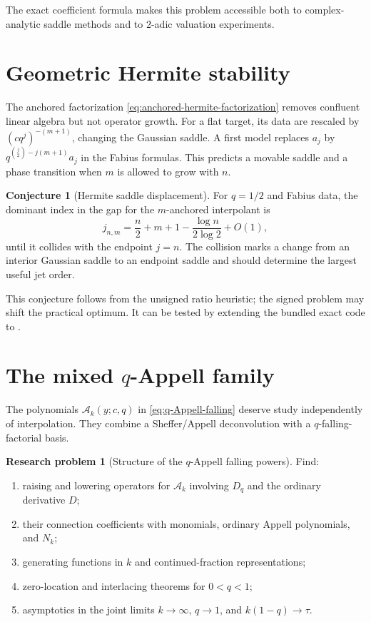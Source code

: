 \documentclass[11pt,oneside]{book}
\numberwithin{equation}{chapter}
\theoremstyle{definition}
\newtheorem{conjecture}[theorem]{Conjecture}
\newtheorem{problem}[theorem]{Research problem}
\theoremstyle{remark}
\begin{document}
The exact coefficient formula makes this problem accessible both to
complex-analytic saddle methods and to $2$-adic valuation experiments.

\section{Geometric Hermite stability}

The anchored factorization \eqref{eq:anchored-hermite-factorization} removes
confluent linear algebra but not operator growth.  For a flat target, its
data are rescaled by $(cq^j)^{-(m+1)}$, changing the Gaussian saddle.
A first model replaces $a_j$ by
$q^{\binom j2-j(m+1)}a_j$ in the Fabius formulas.  This predicts a movable
saddle and a phase transition when $m$ is allowed to grow with $n$.

\begin{conjecture}[Hermite saddle displacement]
\label{conj:hermite-saddle}
For $q=1/2$ and Fabius data, the dominant index in the gap for the
$m$-anchored interpolant is
\begin{equation}
 j_{n,m}=\frac n2+m+1-\frac{\log n}{2\log2}+O(1),
 \label{eq:hermite-saddle-location-conj}
\end{equation}
until it collides with the endpoint $j=n$.  The collision marks a change
from an interior Gaussian saddle to an endpoint saddle and should determine
the largest useful jet order.
\end{conjecture}

This conjecture follows from the unsigned ratio heuristic; the signed
problem may shift the practical optimum.  It can be tested by extending the
bundled exact code to .

\section{The mixed \texorpdfstring{$q$}{q}-Appell family}

The polynomials $\mathscr A_k(y;c,q)$ in
\eqref{eq:q-Appell-falling} deserve study independently of interpolation.
They combine a Sheffer/Appell deconvolution with a $q$-falling-factorial
basis.

\begin{problem}[Structure of the $q$-Appell falling powers]
\label{prob:q-Appell-structure}
Find:
\begin{enumerate}
\item raising and lowering operators for $\mathscr A_k$ involving $D_q$ and
      the ordinary derivative $D$;
\item their connection coefficients with monomials, ordinary Appell
      polynomials, and $N_k$;
\item generating functions in $k$ and continued-fraction representations;
\item zero-location and interlacing theorems for $0<q<1$;
\item asymptotics in the joint limits $k\to\infty$, $q\to1$, and
      $k(1-q)\to\tau$.
\end{enumerate}
\end{problem}
\end{document}
